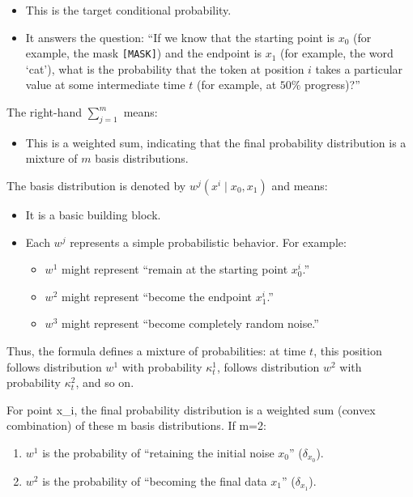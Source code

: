 \begin{itemize}
\tightlist
\item
  This is the target conditional probability.
\item
  It answers the question: ``If we know that the starting point is \(x_0\) (for example, the mask \texttt{{[}MASK{]}}) and the endpoint is \(x_1\) (for example, the word `cat'), what is the probability that the token at position \(i\) takes a particular value at some intermediate time \(t\) (for example, at \(50\%\) progress)?''
\end{itemize}

The right-hand \(\sum_{j=1}^m\) means:

\begin{itemize}
\tightlist
\item
  This is a weighted sum, indicating that the final probability distribution is a mixture of \(m\) basis distributions.
\end{itemize}

The basis distribution is denoted by \(w^j(x^i\mid x_0,x_1)\) and means:

\begin{itemize}
\tightlist
\item
  It is a basic building block.
\item
{}
  Each \(w^j\) represents a simple probabilistic behavior. For example:

  \begin{itemize}
  \tightlist
  \item
    \(w^1\) might represent ``remain at the starting point \(x_0^i\).''
  \item
    \(w^2\) might represent ``become the endpoint \(x_1^i\).''
  \item
    \(w^3\) might represent ``become completely random noise.''
  \end{itemize}
\end{itemize}

Thus, the formula defines a mixture of probabilities: at time \(t\), this position follows distribution \(w^1\) with probability \(\kappa_t^1\), follows distribution \(w^2\) with probability \(\kappa_t^2\), and so on.

For point x\_i, the final probability distribution is a weighted sum (convex combination) of these m basis distributions. If m=2:

\begin{enumerate}
\def\labelenumi{\arabic{enumi}.}
\tightlist
\item
  \(w^1\) is the probability of ``retaining the initial noise \(x_0\)'' (\(\delta_{x_0}\)).
\item
  \(w^2\) is the probability of ``becoming the final data \(x_1\)'' (\(\delta_{x_1}\)).
\end{enumerate}

